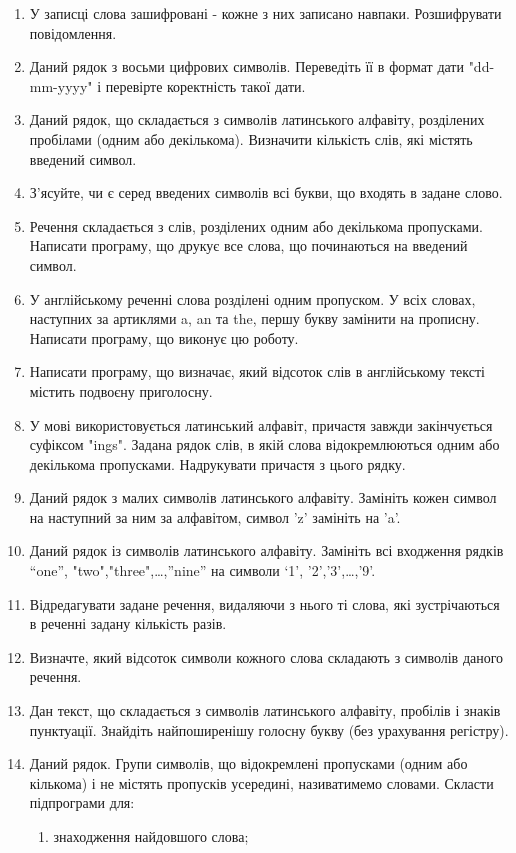 \documentclass[]{article}
\makeatletter
\newcommand{\xslalph}[1]{\expandafter\@xslalph\csname c@#1\endcsname}
\newcommand{\@xslalph}[1]{%
    \ifcase#1\or а\or б\or в\or г\or д\or e\or є\or ж\or з\or i%
    \or й\or к\or л\or м\or н\or о\or п\or р\or с\or т%
    \or у\or ф\or х\or ц\or ч\or ш\or ю\or я\or аа\or бб\or вв %
    \else\@ctrerr\fi%
}
\makeatother
\begin{document}
\begin{enumerate}
\item
У записці слова зашифровані -
кожне з них записано навпаки. Розшифрувати повідомлення.
\item
Даний рядок з восьми цифрових символів. Переведіть її в формат дати
"dd-mm-yyyy" і перевірте коректність такої дати.
\item
Даний рядок, що складається з символів латинського алфавіту, розділених
пробілами (одним або декількома). Визначити кількість слів, які містять
введений символ.
\item
З'ясуйте, чи є серед введених символів всі букви, що входять в задане
слово.
\item
Речення складається з слів, розділених одним або декількома пропусками.
Написати програму, що друкує все слова, що починаються на введений
символ.
\item
У англійському реченні слова розділені одним пропуском. У всіх словах,
наступних за артиклями a, an та the, першу букву замінити на прописну.
Написати програму, що виконує цю роботу.
\item
Написати програму, що визначає, який відсоток слів в англійському тексті
містить подвоєну приголосну.
\item
У мові використовується латинський алфавіт, причастя завжди закінчується
суфіксом "ings". Задана рядок слів, в якій слова відокремлюються одним
або декількома пропусками. Надрукувати причастя з цього рядку.
\item
Даний рядок з малих символів латинського алфавіту. Замініть кожен символ
на наступний за ним за алфавітом, символ 'z' замініть на 'a'.
\item
Даний рядок із символів латинського алфавіту. Замініть всі входження
рядків ``one'', "two","three",\ldots{},''nine'' на символи `1',
'2','3',\ldots{},'9'.
\item
Відредагувати задане речення, видаляючи з нього ті слова, які
зустрічаються в реченні задану кількість разів.
\item
Визначте, який відсоток символи кожного слова складають з символів
даного речення.
\item
Дан текст, що складається з символів латинського алфавіту, пробілів і
знаків пунктуації. Знайдіть найпоширенішу голосну букву (без урахування
регістру).
\item
Даний рядок. Групи символів, що відокремлені пропусками (одним або
кількома) і не містять пропусків усередині, називатимемо словами.
Скласти підпрограми для:
\begin{enumerate}[label=\xslalph*)]
\item
 знаходження найдовшого слова;


\end{enumerate}
\end{enumerate}
\end{document}
